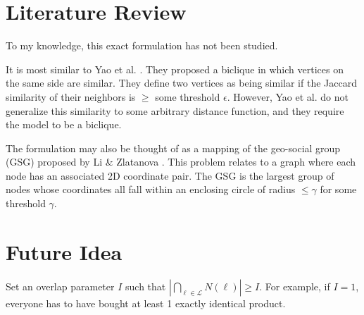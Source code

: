 \section{Literature Review}

To my knowledge, this exact formulation has not been studied.

It is most similar to Yao et al. \cite{yao2022identifying}. They proposed a biclique in which vertices on the same side are similar. They define two vertices as being similar if the Jaccard similarity of their neighbors is $\geq$ some threshold $\epsilon$. However, Yao et al. do not generalize this similarity to some arbitrary distance function, and they require the model to be a biclique.

The formulation may also be thought of as a mapping of the geo-social group (GSG) proposed by Li \& Zlatanova \cite{li2021significant}. This problem relates to a graph where each node has an associated 2D coordinate pair. The GSG is the largest group of nodes whose coordinates all fall within an enclosing circle of radius $\leq \gamma$ for some threshold $\gamma$.

\section{Future Idea}

Set an overlap parameter $I$ such that $|\bigcap_{\ell \in \mathcal{L}}N(\ell)| \geq I$. For example, if $I = 1$, everyone has to have bought at least 1 exactly identical product.